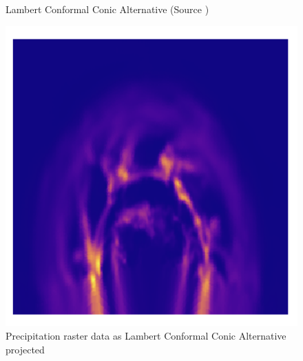 \begin{figure}[h]
\begin{minipage}{0.30\textwidth}
        \caption{Lambert Conformal Conic Alternative (Source \cite{PROJ_SITE})}
        \label{fig:lcca_proj}
    \end{minipage}\hfill
    \begin{minipage}{0.30\textwidth}
        \centering
        \includegraphics[width=0.9\linewidth]{figures/chapter-8/prect_lcca.png}
        \caption{Precipitation raster data as Lambert Conformal Conic Alternative projected}
        \label{fig:lcca_prect_raster}
    \end{minipage}\hfill
\end{figure}

